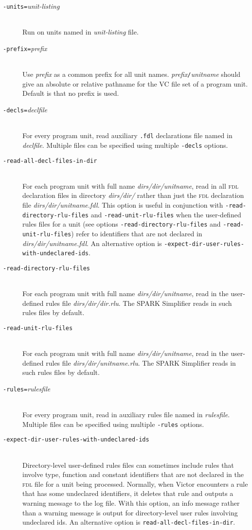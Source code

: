 \documentclass[12pt,fleqn]{article}
\newcommand{\fdl}{\textsc{fdl}}
\newcommand{\optionb}[1]{\item[\texttt{-{#1}}]\ \\}
\newcommand{\optionv}[2]{\item[\texttt{-{#1}=}\mdseries\textit{#2}]\ \\}
\begin{document}
\begin{description}

  \optionv{units}{unit-listing}  Run on units named in \textit{unit-listing}
   file.

  \optionv{prefix}{prefix} 
    Use \textit{prefix} as a common prefix for all unit names.  
    \textit{prefix}\texttt{/}\textit{unitname} should give an absolute or
    relative pathname for the VC file set of a program unit.  Default is
    that no prefix is used.
   
  \optionv{decls}{declfile}
    For every program unit, read auxiliary \texttt{.fdl} 
    declarations file named in \textit{declfile}.  
    Multiple files can be specified using multiple 
    \texttt{-decls} options.

  \optionb{read-all-decl-files-in-dir}
  For each program unit with full name \textit{dirs/dir/unitname},
  read in all \fdl{} declaration files in directory \textit{dirs/dir/} rather
  than just the \fdl{} declaration file \textit{dirs/dir/unitname.fdl}.
  This option is useful in conjunction with 
  \texttt{-read-directory-rlu-files}
  and \texttt{-read-unit-rlu-files} when the user-defined rules files for a
  unit 
  (see options \texttt{-read-directory-rlu-files} 
   and \texttt{-read-unit-rlu-files})
  refer to identifiers that are not declared in \textit{dirs/dir/unitname.fdl}.
  An alternative option is \texttt{-expect-dir-user-rules-with-undeclared-ids}.

  \optionb{read-directory-rlu-files}
  For each program unit with full name \textit{dirs/dir/unitname},
  read in the user-defined rules file \textit{dirs/dir/dir.rlu}.  The SPARK
  Simplifier reads in such rules files by default.

  \optionb{read-unit-rlu-files}
  For each program unit with full name \textit{dirs/dir/unitname},
  read in the user-defined rules file \textit{dirs/dir/unitname.rlu}.  
  The SPARK Simplifier reads in such rules files by default.

  \optionv{rules}{rulesfile} For every program unit, read in
    auxiliary rules file named in \textit{rulesfile}.  Multiple files
    can be specified using multiple \texttt{-rules} options.

  \optionb{expect-dir-user-rules-with-undeclared-ids}
  Directory-level user-defined rules files can sometimes include rules
  that involve type, function and constant identifiers that are not
  declared in the \fdl{} file for a unit being processed.  Normally, when
  Victor encounters a rule that has some undeclared identifiers, it
  deletes that rule and outputs a warning message to the log file.
  With this option, an info message rather than a warning message is
  output for directory-level user rules involving undeclared ids.  An
  alternative option is \texttt{read-all-decl-files-in-dir}.


\end{description}
\end{document}
